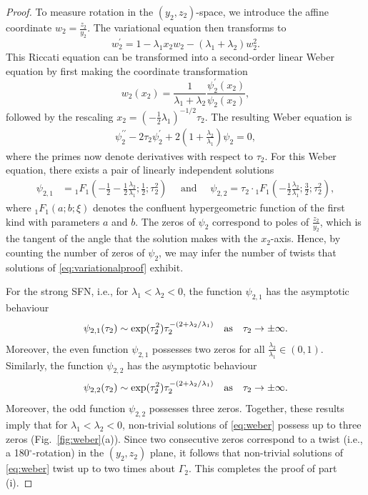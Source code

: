 \documentclass[10pt,onecolumn]{article}
\theoremstyle{plain}
\begin{document}
\begin{proof}
To measure rotation in the $(y_2,z_2)$-space, we introduce the affine coordinate $w_2 = \frac{z_2}{y_2}$. The variational equation then transforms to 
%
\[ w_2^\prime = 1-\lambda_1 x_2 w_2 - (\lambda_1+\lambda_2) w_2^2. \]
%
This Riccati equation can be transformed into a second-order linear Weber equation by first making the coordinate transformation
%
\[ w_2(x_2) = \frac{1}{\lambda_1+\lambda_2} \frac{\psi_2^{\prime}(x_2)}{\psi_2(x_2)}, \]
%
followed by the rescaling $x_2 = \left( -\tfrac{1}{2} \lambda_1 \right)^{-1/2} \tau_2$.
The resulting Weber equation is 
%
\begin{equation}  \label{eq:weber}
  \begin{split}
	\psi_2^{\prime \prime} - 2 \tau_2 \psi_2^\prime + 2 \left( 1+\frac{\lambda_2}{\lambda_1} \right) \psi_2 = 0,
  \end{split}
\end{equation}
%
where the primes now denote derivatives with respect to $\tau_2$. For this Weber equation, there exists a pair of linearly independent solutions 
%
\begin{equation}  \label{eq:lisolutions}
  \begin{split}
    \psi_{2,1} &= {}_1 F_1\left( -\tfrac{1}{2}-\tfrac{1}{2} \tfrac{\lambda_2}{\lambda_1};  \tfrac{1}{2}; \tau_2^2 \right) \quad \text{ and } \quad
    \psi_{2,2} = \tau_2 \cdot  {}_1 F_1\left( -\tfrac{1}{2} \tfrac{\lambda_2}{\lambda_1}; \tfrac{3}{2};  \tau_2^2 \right),
  \end{split}
\end{equation}
%
where $_1 F_1(a;b;\xi)$ denotes the confluent hypergeometric function of the first kind with parameters $a$ and $b$. 
The zeros of $\psi_2$ correspond to poles of $\tfrac{z_2}{y_2}$, which is the tangent of the angle that the solution makes with the $x_2$-axis. Hence, by counting the number of zeros of $\psi_2$, we may infer the number of twists that solutions of \eqref{eq:variationalproof} exhibit. 

For the strong SFN, i.e., for $\lambda_1<\lambda_2<0$, the function $\psi_{2,1}$ has the asymptotic behaviour
%
\[ \psi_{2,1}(\tau_2) \sim \exp (\tau_2^2) \tau_2^{-(2+\lambda_2/\lambda_1)} \quad {\rm as } \quad \tau_2 \to \pm \infty.  \]
%
Moreover, the even function $\psi_{2,1}$ possesses two zeros for all $\tfrac{\lambda_2}{\lambda_1} \in (0,1)$.
Similarly, the function $\psi_{2,2}$ has the asymptotic behaviour
%
\[ \psi_{2,2}(\tau_2) \sim \exp(\tau_2^2) \tau_2^{-(2+\lambda_2/\lambda_1)} \quad {\rm as } \quad \tau_2 \to \pm \infty.  \]
%
Moreover, the odd function $\psi_{2,2}$ possesses three zeros.
Together, these results imply that for $\lambda_1<\lambda_2<0$, non-trivial solutions of \eqref{eq:weber} possess up to three zeros (Fig.~\ref{fig:weber}(a)). 
Since two consecutive zeros correspond to a twist (i.e., a 180$^{\circ}$-rotation) in the $(y_2,z_2)$ plane, it follows that non-trivial solutions of \eqref{eq:weber} twist up to two times about $\Gamma_2$. 
This completes the proof of part (i). %


\end{proof}
\end{document}
